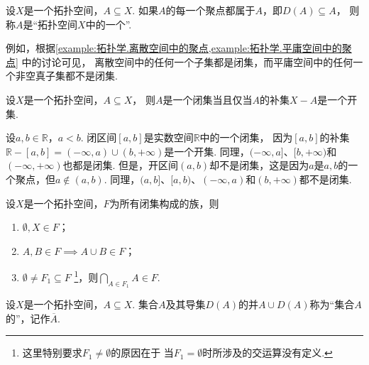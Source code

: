 \begin{definition}\label{definition:拓扑学.闭集的概念}
设\(X\)是一个拓扑空间，\(A \subseteq X\).
如果\(A\)的每一个聚点都属于\(A\)，即\(D(A) \subseteq A\)，
则称\(A\)是“拓扑空间\(X\)中的一个”.
\end{definition}

例如，根据\cref{example:拓扑学.离散空间中的聚点,example:拓扑学.平庸空间中的聚点} 中的讨论可见，
离散空间中的任何一个子集都是闭集，而平庸空间中的任何一个非空真子集都不是闭集.

\begin{theorem}\label{theorem:拓扑学.成为闭集的充分必要条件1}
设\(X\)是一个拓扑空间，\(A \subseteq X\)，
则\(A\)是一个闭集当且仅当\(A\)的补集\(X - A\)是一个开集.
\end{theorem}

\begin{example}
设\(a,b\in\mathbb{R}\)，\(a<b\).
闭区间\([a,b]\)是实数空间\(\mathbb{R}\)中的一个闭集，
因为\([a,b]\)的补集\(\mathbb{R}-[a,b]
=(-\infty,a)\cup(b,+\infty)\)是一个开集.
同理，\((-\infty,a]\)、\([b,+\infty)\)和\((-\infty,+\infty)\)也都是闭集.
但是，开区间\((a,b)\)却不是闭集，这是因为\(a\)是\(a,b\)的一个聚点，但\(a\notin(a,b)\).
同理，\((a,b]\)、\([a,b)\)、\((-\infty,a)\)和\((b,+\infty)\)都不是闭集.
\end{example}

\begin{theorem}\label{theorem:拓扑学.闭集族的性质}
设\(X\)是一个拓扑空间，\(F\)为所有闭集构成的族，则
\begin{enumerate}
	\item \(\emptyset,X \in F\)；
	\item \(A,B \in F \implies A \cup B \in F\)；
	\item \(\emptyset \neq F_1 \subseteq F\)
	\footnote{%
		这里特别要求\(F_1 \neq \emptyset\)的原因在于
		当\(F_1 = \emptyset\)时所涉及的交运算没有定义.
	}，则\(\bigcap_{A \in F_1} A \in F\).
\end{enumerate}
\end{theorem}

\begin{definition}\label{definition:拓扑学.闭包的概念}
设\(X\)是一个拓扑空间，\(A \subseteq X\).
集合\(A\)及其导集\(D(A)\)的并\(A \cup D(A)\)称为“集合\(A\)的”，记作\(\overline{A}\).
\end{definition}

